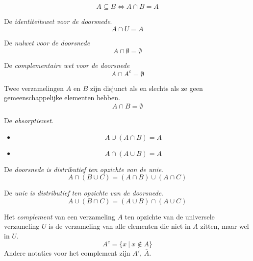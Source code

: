 \documentclass[main.tex]{subfiles}
\begin{document}
\begin{st}
  \[ A \subseteq B \Leftrightarrow A \cap B = A \]
\end{st}


\begin{st}
  De \emph{identiteitswet voor de doorsnede}.
  \[ A \cap U = A \]
\end{st}

\begin{st}
  De \emph{nulwet voor de doorsnede}
  \[ A \cap \emptyset = \emptyset \]
\end{st}

\begin{st}
  De \emph{complementaire wet voor de doorsnede}
  \[ A \cap A^{c} = \emptyset \]
\end{st}

\begin{de}
  Twee verzamelingen $A$ en $B$ zijn disjunct als en slechts als ze geen gemeenschappelijke elementen hebben.
  \[ A \cap B = \emptyset \]
\end{de}

\begin{st}
  De \emph{absorptiewet}.
  \begin{itemize}
  \item \[ A \cup ( A \cap B ) = A\]
  \item \[ A \cap ( A \cup B ) = A\]
  \end{itemize}
\end{st}

\begin{st}
  De \emph{doorsnede is distributief ten opzichte van de unie}.
  \[ A \cap ( B \cup C ) = (A \cap B) \cup (A \cap C) \]
\end{st}

\begin{st}
  De \emph{unie is distributief ten opzichte van de doorsnede}.
  \[ A \cup ( B \cap C ) = (A \cup B) \cap (A \cup C) \]
\end{st}

\begin{de}
  Het \emph{complement} van een verzameling $A$ ten opzichte van de universele verzameling $U$ is de verzameling van alle elementen die niet in $A$ zitten, maar wel in $U$.
  \[ A^{c} = \{ x\ |\ x \not\in A \} \]
  Andere notaties voor het complement zijn $A'$, $\overline{A}$. 
\end{de}
\end{document}
